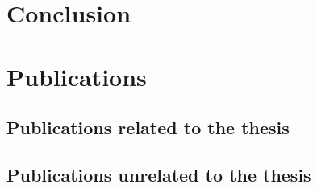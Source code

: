 \documentclass[11pt]{article}
\begin{document}
\section{Conclusion}
\label{sec:conclusion}

\section{Publications}
\label{sec:publications}
\subsection*{Publications related to the thesis}
\begin{refsection}
    \nocite{*}
    \printbibliography[keyword=related,heading=none]
\end{refsection}

\subsection*{Publications unrelated to the thesis}

\begin{refsection}
    \nocite{*}
    \printbibliography[keyword=unrelated,heading=none]
\end{refsection}

\begin{refsection}
    \nocite{*}
    \printbibliography[keyword=foreign]
\end{refsection}
\end{document}
